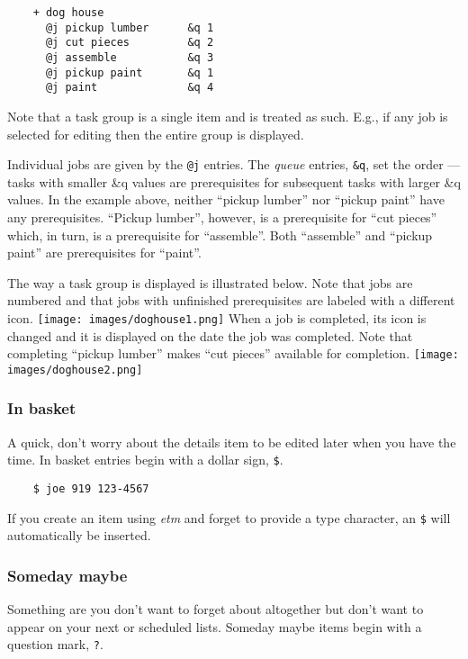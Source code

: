 \documentclass[]{article}
\makeatletter
\def\maxwidth{\ifdim\Gin@nat@width>\linewidth\linewidth
\else\Gin@nat@width\fi}
\let\Oldincludegraphics\includegraphics
\renewcommand{\includegraphics}[1]{\Oldincludegraphics[width=\maxwidth]{#1}}
\makeatother
\begin{document}
\begin{verbatim}
    + dog house
      @j pickup lumber      &q 1
      @j cut pieces         &q 2
      @j assemble           &q 3
      @j pickup paint       &q 1
      @j paint              &q 4
\end{verbatim}

Note that a task group is a single item and is treated as such. E.g., if
any job is selected for editing then the entire group is displayed.

Individual jobs are given by the \texttt{@j} entries. The \emph{queue}
entries, \texttt{\&q}, set the order --- tasks with smaller \&q values
are prerequisites for subsequent tasks with larger \&q values. In the
example above, neither ``pickup lumber'' nor ``pickup paint'' have any
prerequisites. ``Pickup lumber'', however, is a prerequisite for ``cut
pieces'' which, in turn, is a prerequisite for ``assemble''. Both
``assemble'' and ``pickup paint'' are prerequisites for ``paint''.

The way a task group is displayed is illustrated below. Note that jobs
are numbered and that jobs with unfinished prerequisites are labeled
with a different icon.
\texttt{[image: images/doghouse1.png]}
When a job is completed, its icon is changed and it is displayed on the
date the job was completed. Note that completing ``pickup lumber'' makes
``cut pieces'' available for completion.
\texttt{[image: images/doghouse2.png]}
\subsubsection{In basket}

A quick, don't worry about the details item to be edited later when you
have the time. In basket entries begin with a dollar sign, \texttt{\$}.

\begin{verbatim}
    $ joe 919 123-4567
\end{verbatim}

If you create an item using \emph{etm} and forget to provide a type
character, an \texttt{\$} will automatically be inserted.

\subsubsection{Someday maybe}

Something are you don't want to forget about altogether but don't want
to appear on your next or scheduled lists. Someday maybe items begin
with a question mark, \texttt{?}.
\end{document}
